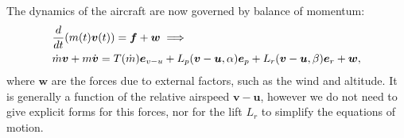 \documentclass{article}
\renewcommand{\vec}[1]{\boldsymbol{#1}}
\begin{document}
The dynamics of the aircraft are now governed by balance of momentum:
\begin{align}
   \notag & \frac{d}{dt} (m(t) \vec{v}(t)) = \vec{f} + \vec{w} \implies
\\ \label{eqns:motion-vector}
    & \dot{m}\vec{v} + m \dot{\vec{v}} = T(\dot{m}) \vec e_{v-u} + {L_p}(\vec v - \vec u, \alpha) \vec{e}_p  + {L_r}(\vec v - \vec u,\beta) \vec{e}_r + \vec w,
\end{align}
where $\vec w$ are the forces due to external factors, such as the wind and altitude. It is generally a function of the relative airspeed $\vec v - \vec u$, however we do not need to give explicit forms for this forces, nor for the lift $L_r$ to simplify the equations of motion. 
\end{document}

